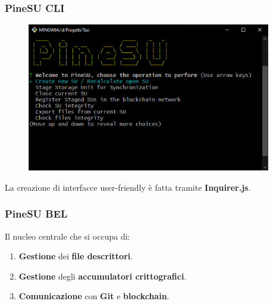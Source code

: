 \documentclass{beamer}
\begin{document}
\begin{frame}
	\frametitle{PineSU CLI}
	\centering
	\begin{figure}
		\includegraphics[width=0.95\textwidth]{figures/menu.jpg}
	\end{figure}
	La creazione di interfacce user-friendly è fatta tramite \textbf{Inquirer.js}.
\end{frame}

\begin{frame}
	\frametitle{PineSU BEL}
	Il nucleo centrale che si occupa di:
	\begin{enumerate}
		\item \textbf{Gestione} dei \textbf{file descrittori}.
		\item \textbf{Gestione} degli \textbf{accumulatori crittografici}.
		\item \textbf{Comunicazione} con \textbf{Git} e \textbf{blockchain}.
	\end{enumerate}
\end{frame}
\end{document}
